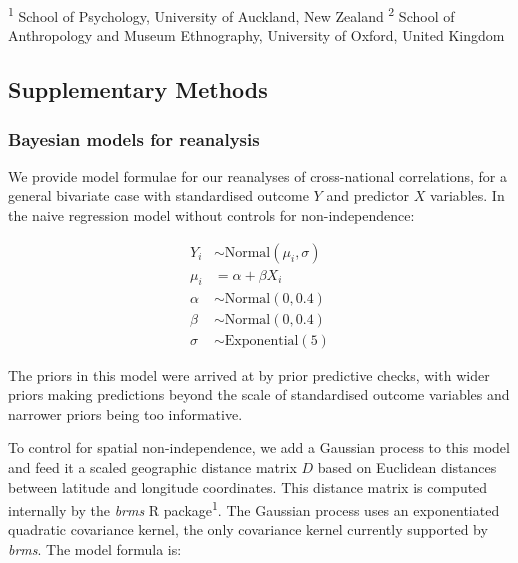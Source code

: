 \documentclass[
  man,floatsintext]{apa6}
\begin{document}
\raggedright

\noindent \footnotesize \textsuperscript{1} School of Psychology, University of Auckland, New Zealand \newline
\noindent \footnotesize \textsuperscript{2} School of Anthropology and Museum Ethnography, University of Oxford, United Kingdom
\normalsize
\newpage

\hypertarget{supplementary-methods}{%
\subsection{Supplementary Methods}\label{supplementary-methods}}

\hypertarget{bayesian-models-for-reanalysis}{%
\subsubsection{Bayesian models for reanalysis}\label{bayesian-models-for-reanalysis}}

We provide model formulae for our reanalyses of cross-national correlations, for a general bivariate case with standardised outcome \(Y\) and predictor \(X\) variables. In the naive regression model without controls for non-independence:

\begin{align}
Y_{i} &\sim \text{Normal}(\mu_{i},\sigma) \\
\mu_{i} &= \alpha + \beta X_{i} \nonumber \\
\alpha &\sim \text{Normal}(0, 0.4) \nonumber \\
\beta &\sim \text{Normal}(0, 0.4) \nonumber \\
\sigma &\sim \text{Exponential}(5) \nonumber
\end{align}

The priors in this model were arrived at by prior predictive checks, with wider priors making predictions beyond the scale of standardised outcome variables and narrower priors being too informative.

To control for spatial non-independence, we add a Gaussian process to this model and feed it a scaled geographic distance matrix \(D\) based on Euclidean distances between latitude and longitude coordinates. This distance matrix is computed internally by the \emph{brms} R package\textsuperscript{1}. The Gaussian process uses an exponentiated quadratic covariance kernel, the only covariance kernel currently supported by \emph{brms}. The model formula is:
\end{document}
